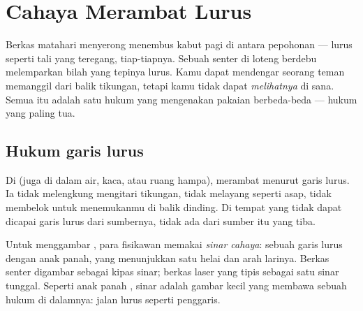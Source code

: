 \chapter{Cahaya Merambat Lurus}\label{ch:g4:light-straight-lines}

Berkas matahari menyerong menembus kabut pagi di antara pepohonan ---
lurus seperti tali yang teregang, tiap-tiapnya. Sebuah senter di
loteng berdebu melemparkan bilah  yang tepinya lurus. Kamu dapat
mendengar seorang teman memanggil dari balik tikungan, tetapi kamu
tidak dapat \emph{melihatnya} di sana. Semua itu adalah satu hukum
yang mengenakan pakaian berbeda-beda --- hukum  yang paling tua.

\section{Hukum garis lurus}

\begin{proposition}\label{prop:g4:light-straight-lines:law}
Di  (juga di dalam air, kaca, atau ruang hampa),  merambat
menurut garis lurus. Ia tidak melengkung mengitari tikungan, tidak
melayang seperti asap, tidak membelok untuk menemukanmu di balik
dinding. Di tempat yang tidak dapat dicapai garis lurus dari
sumbernya, tidak ada  dari sumber itu yang tiba.
\end{proposition}

\begin{definition}\label{def:g4:light-straight-lines:ray}
Untuk menggambar , para fisikawan memakai
\emph{sinar cahaya}: sebuah garis lurus dengan
anak panah, yang menunjukkan satu helai  dan arah larinya.
Berkas senter digambar sebagai kipas sinar; berkas laser yang tipis
sebagai satu sinar tunggal. Seperti anak panah , sinar adalah
gambar kecil yang membawa sebuah hukum di dalamnya: jalan  lurus
seperti penggaris.
\end{definition}

